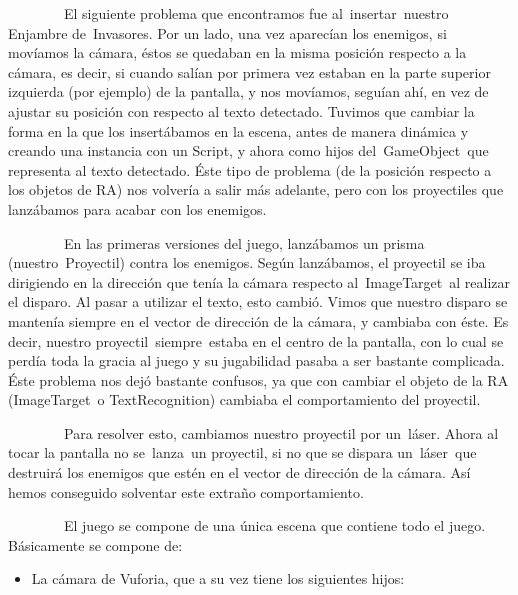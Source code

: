 \documentclass[]{article}
\begin{document}
~~~~~~~~El siguiente problema que encontramos fue al~insertar~nuestro
Enjambre de~Invasores. Por un lado, una vez aparecían los enemigos, si
movíamos la cámara, éstos se quedaban en la misma posición respecto a la
cámara, es decir, si cuando salían por primera vez estaban en la parte
superior izquierda (por ejemplo) de la pantalla, y nos movíamos, seguían
ahí, en vez de ajustar su posición con respecto al texto detectado.
Tuvimos que cambiar la forma en la que los insertábamos en la escena,
antes de manera dinámica y creando una instancia con un Script, y ahora
como hijos del~GameObject~que representa al texto detectado. Éste tipo
de problema (de la posición respecto a los objetos de RA) nos volvería a
salir más adelante, pero con los proyectiles que lanzábamos para acabar
con los enemigos.

~~~~~~~~En las primeras versiones del juego, lanzábamos un prisma
(nuestro~Proyectil) contra los enemigos. Según lanzábamos, el proyectil
se iba dirigiendo en la dirección que tenía la cámara respecto
al~ImageTarget~al realizar el disparo. Al pasar a utilizar el texto,
esto cambió. Vimos que nuestro disparo se mantenía siempre en el vector
de dirección de la cámara, y cambiaba con éste. Es decir, nuestro
proyectil~siempre~estaba en el centro de la pantalla, con lo cual se
perdía toda la gracia al juego y su jugabilidad pasaba a ser bastante
complicada. Éste problema nos dejó bastante confusos, ya que con cambiar
el objeto de la RA (ImageTarget~o TextRecognition) cambiaba el
comportamiento del proyectil.

~~~~~~~~Para resolver esto, cambiamos nuestro proyectil por un~láser.
Ahora al tocar la pantalla no se~lanza~un proyectil, si no que se
dispara un~láser~que destruirá los enemigos que estén en el vector de
dirección de la cámara. Así hemos conseguido solventar este extraño
comportamiento.


~~~~~~~~El juego se compone de una única escena que contiene todo el
juego. Básicamente se compone de:

\begin{itemize}
\itemsep1pt\parskip0pt
\item
  La cámara de Vuforia, que a su vez tiene los siguientes hijos:
\end{itemize}
\end{document}
